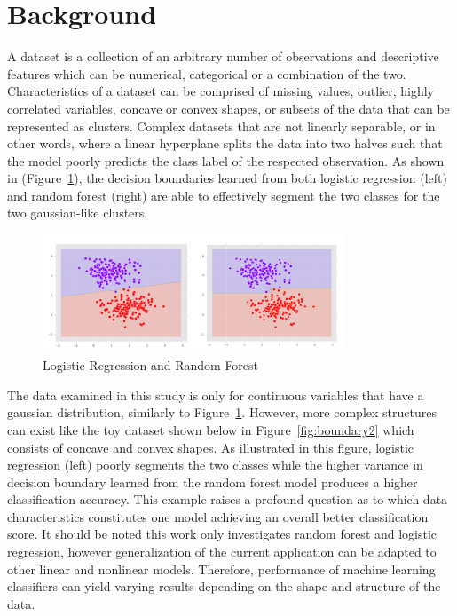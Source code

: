 \documentclass{llncs}
\begin{document}
\section{Background}
\noindent 

A dataset is a collection of an arbitrary number of observations and descriptive features which can be numerical, categorical or a combination of the two. Characteristics of a dataset can be comprised of missing values, outlier, highly correlated variables, concave or convex shapes, or subsets of the data that can be represented as clusters. Complex datasets that are not linearly separable, or in other words, where a linear hyperplane splits the data into two halves such that the model poorly predicts the class label of the respected observation. As shown in (Figure~\ref{fig:boundary1}), the decision boundaries learned from both logistic regression (left) and random forest (right) are able to effectively segment the two classes for the two gaussian-like clusters.

\begin{figure}
\centering
\includegraphics[width=0.8\textwidth]{decisionboundary.png}
\caption{Logistic Regression and Random Forest}
\label{fig:boundary1}
\end{figure}

\noindent 
The data examined in this study is only for continuous variables that have a gaussian distribution, similarly to Figure~\ref{fig:boundary1}. However, more complex structures can exist like the toy dataset shown below in Figure~\ref{fig:boundary2} which consists of concave and convex shapes. As illustrated in this figure, logistic regression (left) poorly segments the two classes while the higher variance in decision boundary learned from the random forest model produces a higher classification accuracy. This example raises a profound question as to which data characteristics constitutes one model achieving an overall better classification score. It should be noted this work only investigates random forest and logistic regression, however generalization of the current application can be adapted to other linear and nonlinear models. Therefore, performance of machine learning classifiers can yield varying results depending on the shape and structure of the data.
\end{document}

